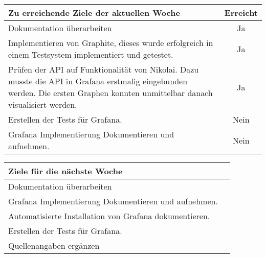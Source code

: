 \begin{tabularx}{\textwidth}{Xc}
    \arrayrulecolor{OliveGreen}
    \toprule
    {\bfseries Zu erreichende Ziele der aktuellen Woche} & {\bfseries Erreicht} \\
    \midrule[2pt]
    Dokumentation überarbeiten                              &Ja              \\
    \rowcolor{OliveGreen!15}
    Implementieren von Graphite, dieses wurde erfolgreich in einem Testsystem
    implementiert und getestet.                             &Ja              \\
    \rowcolor{White}
    Prüfen der API auf Funktionalität von Nikolai. Dazu musste die API in
    Grafana erstmalig eingebunden werden. Die ersten Graphen konnten
    unmittelbar danach visualisiert werden.           &Ja              \\
    \rowcolor{OliveGreen!15}
    Erstellen der Tests für Grafana.                         &Nein            \\
    \rowcolor{White}
    Grafana Implementierung Dokumentieren und aufnehmen.     &Nein            \\
    \bottomrule[2pt]
\end{tabularx}
%
\vspace{1cm}
%
\begin{tabularx}{\textwidth}{Xc}
    \arrayrulecolor{OliveGreen}
    \toprule
    {\bfseries Ziele für die nächste Woche}        &                         \\
    \midrule[2pt]
    Dokumentation überarbeiten                     &                         \\
    \rowcolor{OliveGreen!15}
    Grafana Implementierung Dokumentieren und aufnehmen.   &                  \\
    \rowcolor{White}
    Automatisierte Installation von Grafana dokumentieren.        &           \\
    \rowcolor{OliveGreen!15}
    Erstellen der Tests für Grafana.                       &                  \\
    \rowcolor{White}
    Quellenangaben ergänzen                               &                  \\
\end{tabularx}
